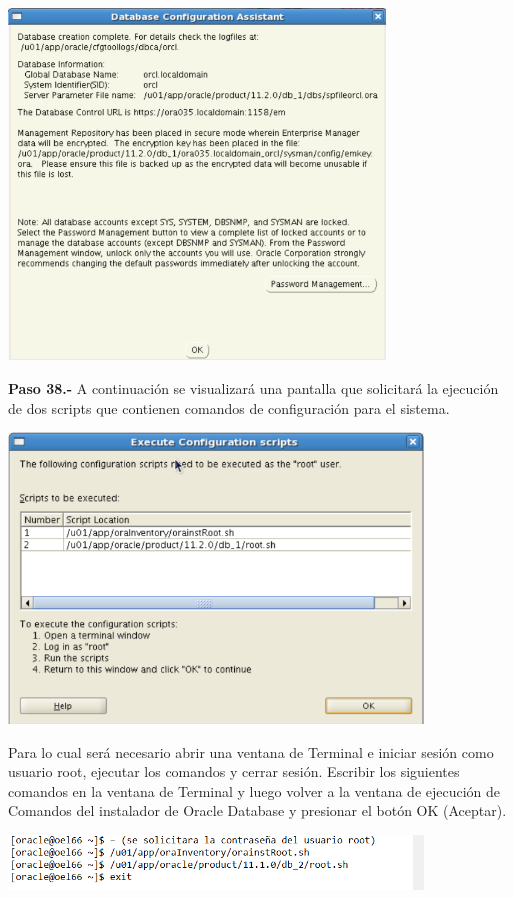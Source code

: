 \begin{enumerate}
\begin{center}
  \includegraphics[width=10cm]{Imagenes/Oracle_Database/Paso_37.png}
\end{center}
\break

\textbf {Paso 38.-} A continuación se visualizará una pantalla que solicitará la ejecución de dos scripts que contienen comandos de configuración para el sistema.

\begin{center}
  \includegraphics[width=11cm]{Imagenes/Oracle_Database/Paso_38.png}
\end{center}
Para lo cual será necesario abrir una ventana de Terminal e iniciar sesión como usuario root, ejecutar los
comandos y cerrar sesión. Escribir los siguientes comandos en la ventana de Terminal y luego volver a la
ventana de ejecución de Comandos del instalador de Oracle Database y presionar el botón OK (Aceptar).
\begin{center}
  \includegraphics[width=11cm]{Imagenes/Oracle_Database/Paso_38_2.png}
\end{center}
\vspace{12pt}\\


\end{enumerate}
